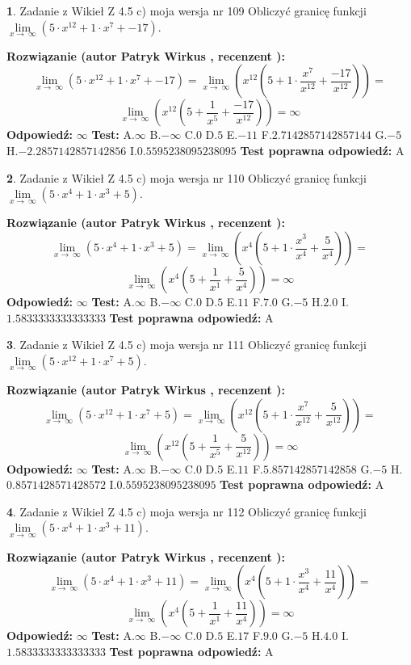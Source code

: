 \documentclass[12pt, a4paper]{article}
\theoremstyle{definition} %
\newtheorem{zad}{}
\newcommand{\zadStart}[1]{\begin{zad}#1\newline}
\newcommand{\zadStop}{\end{zad}}
\newcommand{\rozwStart}[2]{\noindent \textbf{Rozwiązanie (autor #1 , recenzent #2): }\newline}
\newcommand{\rozwStop}{\newline}
\newcommand{\odpStart}{\noindent \textbf{Odpowiedź:}\newline}
\newcommand{\odpStop}{\newline}
\newcommand{\testStart}{\noindent \textbf{Test:}\newline}
\newcommand{\testStop}{\newline}
\newcommand{\kluczStart}{\noindent \textbf{Test poprawna odpowiedź:}\newline}
\newcommand{\kluczStop}{\newline}
\begin{document}
\zadStart{Zadanie z Wikieł Z 4.5 c) moja wersja nr 109}
Obliczyć granicę funkcji  $\lim\limits_{x\to\ \infty}(5 \cdot x^{12}+1 \cdot x^{7}+-17)$.
\zadStop
\rozwStart{Patryk Wirkus}{}
$$\lim\limits_{x\to\ \infty}(5 \cdot x^{12}+1 \cdot x^{7}+-17) = \lim\limits_{x\to\ \infty}(x^{12}(5 +1 \cdot \frac{x^{7}}{x^{12}}+\frac{-17}{x^{12}})) =$$ $$\lim\limits_{x\to\ \infty}(x^{12}(5 +\frac{1}{x^{5}}+\frac{-17}{x^{12}})) =\infty$$
\rozwStop
\odpStart
$\infty$
\odpStop
\testStart
A.$\infty$ B.$-\infty$ C.$0$ D.$5$ E.$-11$
F.$2.7142857142857144$ G.$-5$
H.$-2.2857142857142856$
I.$0.5595238095238095$
\testStop
\kluczStart
A
\kluczStop



\zadStart{Zadanie z Wikieł Z 4.5 c) moja wersja nr 110}
Obliczyć granicę funkcji  $\lim\limits_{x\to\ \infty}(5 \cdot x^{4}+1 \cdot x^{3}+5)$.
\zadStop
\rozwStart{Patryk Wirkus}{}
$$\lim\limits_{x\to\ \infty}(5 \cdot x^{4}+1 \cdot x^{3}+5) = \lim\limits_{x\to\ \infty}(x^{4}(5 +1 \cdot \frac{x^{3}}{x^{4}}+\frac{5}{x^{4}})) =$$ $$\lim\limits_{x\to\ \infty}(x^{4}(5 +\frac{1}{x^{1}}+\frac{5}{x^{4}})) =\infty$$
\rozwStop
\odpStart
$\infty$
\odpStop
\testStart
A.$\infty$ B.$-\infty$ C.$0$ D.$5$ E.$11$
F.$7.0$ G.$-5$
H.$2.0$
I.$1.5833333333333333$
\testStop
\kluczStart
A
\kluczStop



\zadStart{Zadanie z Wikieł Z 4.5 c) moja wersja nr 111}
Obliczyć granicę funkcji  $\lim\limits_{x\to\ \infty}(5 \cdot x^{12}+1 \cdot x^{7}+5)$.
\zadStop
\rozwStart{Patryk Wirkus}{}
$$\lim\limits_{x\to\ \infty}(5 \cdot x^{12}+1 \cdot x^{7}+5) = \lim\limits_{x\to\ \infty}(x^{12}(5 +1 \cdot \frac{x^{7}}{x^{12}}+\frac{5}{x^{12}})) =$$ $$\lim\limits_{x\to\ \infty}(x^{12}(5 +\frac{1}{x^{5}}+\frac{5}{x^{12}})) =\infty$$
\rozwStop
\odpStart
$\infty$
\odpStop
\testStart
A.$\infty$ B.$-\infty$ C.$0$ D.$5$ E.$11$
F.$5.857142857142858$ G.$-5$
H.$0.8571428571428572$
I.$0.5595238095238095$
\testStop
\kluczStart
A
\kluczStop



\zadStart{Zadanie z Wikieł Z 4.5 c) moja wersja nr 112}
Obliczyć granicę funkcji  $\lim\limits_{x\to\ \infty}(5 \cdot x^{4}+1 \cdot x^{3}+11)$.
\zadStop
\rozwStart{Patryk Wirkus}{}
$$\lim\limits_{x\to\ \infty}(5 \cdot x^{4}+1 \cdot x^{3}+11) = \lim\limits_{x\to\ \infty}(x^{4}(5 +1 \cdot \frac{x^{3}}{x^{4}}+\frac{11}{x^{4}})) =$$ $$\lim\limits_{x\to\ \infty}(x^{4}(5 +\frac{1}{x^{1}}+\frac{11}{x^{4}})) =\infty$$
\rozwStop
\odpStart
$\infty$
\odpStop
\testStart
A.$\infty$ B.$-\infty$ C.$0$ D.$5$ E.$17$
F.$9.0$ G.$-5$
H.$4.0$
I.$1.5833333333333333$
\testStop
\kluczStart
A
\kluczStop
\end{document}
